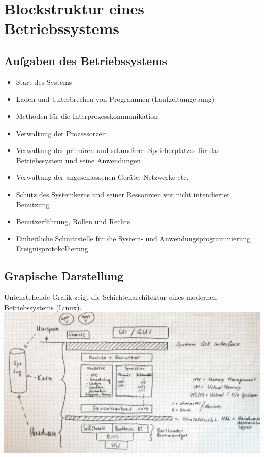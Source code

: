 \documentclass[a4paper, 10pt]{article}
\begin{document}
\section{Blockstruktur eines Betriebssystems}
\subsection{Aufgaben des Betriebssystems}
\begin{itemize}
\item Start des Systems
\item Laden und Unterbrechen von Programmen (Laufzeitumgebung)
\item Methoden für die Interprozesskommunikation
\item Verwaltung der Prozessorzeit
\item Verwaltung des primären und sekundären Speicherplatzes für das Betriebssystem und seine Anwendungen
\item Verwaltung der angeschlossenen Geräte, Netzwerke etc.
\item Schutz des Systemkerns und seiner Ressourcen vor nicht intendierter Benutzung
\item Benutzerführung, Rollen und Rechte
\item Einheitliche Schnittstelle für die System- und Anwendungsprogrammierung Ereignisprotokollierung

\end{itemize}

\subsection{Grapische Darstellung}
Untenstehende Grafik zeigt die Schichtenarchitektur eines modernen Betriebssystems (Linux).\\
\includegraphics[scale=0.15]{Bsys.jpg}\\
\end{document}
